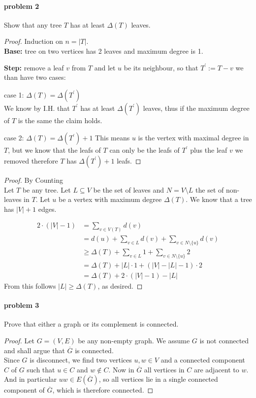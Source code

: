 \paragraph{problem 2} 
Show that any tree $ T $ has at least $ \Delta(T) $ leaves. 
\begin{proof}
Induction on $ n = |T| $.
\\
\textbf{Base:} tree on two vertices has 2 leaves and maximum degree is 1.

\smallskip
\noindent \textbf{Step:} remove a leaf $ v $ from $ T $ and let $ u $ be its neighbour,
so that $ T^\prime := T - v $ we than have two cases:

\smallskip \noindent
case 1: $ \Delta(T) = \Delta(T^\prime) $ \\
We know by I.H. that $ T^\prime $ has at least $ \Delta(T^\prime) $ leaves, thus 
if the maximum degree of $ T $ is the same the claim holds.

\bigskip \noindent
case 2: $ \Delta(T) = \Delta(T^\prime) + 1 $
This means $ u $ is the vertex with maximal degree in $ T $, but we know that the
leafs of $ T $ can only be the leafs of $ T^\prime $ plus the leaf $ v $ we removed
therefore $ T $ has $ \Delta(T^\prime) + 1 $ leafs.

\end{proof}
\begin{proof} By Counting $ $ \\
Let $ T $ be any tree. Let $ L \subseteq V $ be the set of leaves and 
$ N = V \setminus L $ the set of non-leaves in $ T $. Let $ u $ be a vertex 
with maximum degree $ \Delta(T) $. We know that a tree has $ |V| + 1 $ edges.

\begin{align}
    2 \cdot (|V| - 1) &= \sum_{v \in V(T)} d(v) \\
    &= d(u) + \sum_{v \in L} d(v) + \sum_{v \in N \setminus \{u\}} d(v) \\
    &\geq \Delta(T) + \sum_{v \in L} 1 + \sum_{v \in N \setminus \{u\}} 2 \\
    &= \Delta(T) + |L| \cdot 1 + (|V| - |L| - 1) \cdot 2  \\
    &= \Delta(T) + 2 \cdot (|V| - 1) - |L|
\end{align}
From this follows $ |L| \geq \Delta(T) $, as desired.
\end{proof}

\paragraph{problem 3}
Prove that either a graph or its complement is connected.
\begin{proof}
    Let $ G = (V,E) $ be any non-empty graph. We assume $ G $ is not connected and 
    shall argue that $ \overline{G} $ is connected. \\
    Since $ G $ is disconnect, we find two vertices $ u,w \in V $ and a connected
    component $ C $ of $ G $ such that $ u \in C $ and $ w \notin C $. Now in 
    $ \overline{G} $ all vertices in $ C $ are adjacent to $ w $. And in 
    particular $ uw \in E(\overline{G}) $, so all vertices lie in a single connected
    component of $ \overline{G} $, which is therefore connected.
\end{proof}


